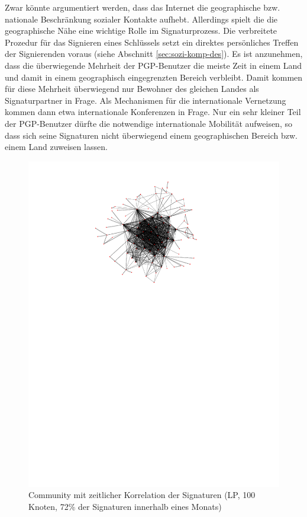 Zwar k\"onnte argumentiert werden, dass das Internet die geographische
bzw. nationale Beschr\"ankung sozialer Kontakte aufhebt. Allerdings
spielt die die geographische N\"ahe eine wichtige Rolle im
Signaturprozess. Die verbreitete Prozedur f\"ur das Signieren eines
Schl\"ussels setzt ein direktes pers\"onliches Treffen der
Signierenden voraus (siehe Abschnitt \ref{sec:sozi-komp-des}). Es ist
anzunehmen, dass die \"uberwiegende Mehrheit der PGP-Benutzer die
meiste Zeit in einem Land und damit in einem geographisch
eingegrenzten Bereich verbleibt. Damit kommen f\"ur diese Mehrheit
\"uberwiegend nur Bewohner des gleichen Landes als Signaturpartner in
Frage. Als Mechanismen f\"ur die internationale Vernetzung kommen dann
etwa internationale Konferenzen in Frage. Nur ein sehr kleiner Teil
der PGP-Benutzer d\"urfte die notwendige internationale Mobilit\"at
aufweisen, so dass sich seine Signaturen nicht \"uberwiegend einem
geographischen Bereich bzw. einem Land zuweisen lassen.

\begin{figure}[h]
  \centering
  \includegraphics[scale=1.5]{images/subgraph-label-time-fa62cc57cd35e9f90b85435efc407ad5.pdf}
  \caption{Community mit zeitlicher Korrelation der Signaturen (LP,
    100 Knoten, 72\% der Signaturen innerhalb eines Monats)}
  \label{fig:time-corr-com-normal}
\end{figure}


